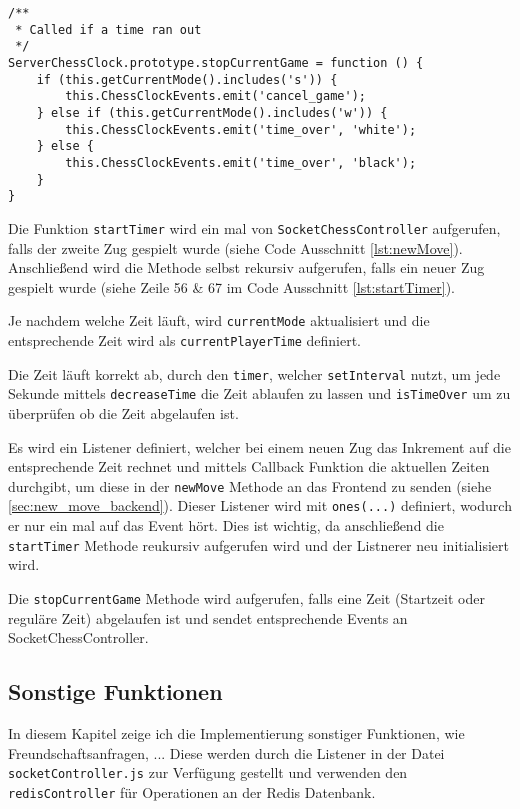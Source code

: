 \begin{lstlisting}[style=codeStyle, caption={Die startTimer und stopCurrentGame Methoden der ServerChessClock Klasse}, label={lst:startTimer}]
/**
 * Called if a time ran out
 */
ServerChessClock.prototype.stopCurrentGame = function () {
    if (this.getCurrentMode().includes('s')) {
        this.ChessClockEvents.emit('cancel_game');
    } else if (this.getCurrentMode().includes('w')) {
        this.ChessClockEvents.emit('time_over', 'white');
    } else {
        this.ChessClockEvents.emit('time_over', 'black');
    }
}
\end{lstlisting}

Die Funktion \verb|startTimer| wird ein mal von \verb|SocketChessController| aufgerufen, falls der zweite Zug gespielt wurde (siehe Code Ausschnitt \ref{lst:newMove}). Anschließend wird die Methode selbst rekursiv aufgerufen, falls ein neuer Zug gespielt wurde (siehe Zeile 56 \& 67 im Code Ausschnitt \ref{lst:startTimer}).

Je nachdem welche Zeit läuft, wird \verb|currentMode| aktualisiert und die entsprechende Zeit wird als \verb|currentPlayerTime| definiert.

Die Zeit läuft korrekt ab, durch den \verb|timer|, welcher \verb|setInterval| nutzt, um jede Sekunde mittels \verb|decreaseTime| die Zeit ablaufen zu lassen und \verb|isTimeOver| um zu überprüfen ob die Zeit abgelaufen ist.

Es wird ein Listener definiert, welcher bei einem neuen Zug das Inkrement auf die entsprechende Zeit rechnet und mittels Callback Funktion die aktuellen Zeiten durchgibt, um diese in der \verb|newMove| Methode an das Frontend zu senden (siehe \ref{sec:new_move_backend}). Dieser Listener wird mit \verb|ones(...)| definiert, wodurch er nur ein mal auf das Event hört. Dies ist wichtig, da anschließend die \verb|startTimer| Methode reukursiv aufgerufen wird und der Listnerer neu initialisiert wird.

Die \verb|stopCurrentGame| Methode wird aufgerufen, falls eine Zeit (Startzeit oder reguläre Zeit) abgelaufen ist und sendet entsprechende Events an SocketChessController.


\subsection{Sonstige Funktionen}
In diesem Kapitel zeige ich die Implementierung sonstiger Funktionen, wie Freundschaftsanfragen, ... Diese werden durch die Listener in der Datei \verb|socketController.js| zur Verfügung gestellt und verwenden den \verb|redisController| für Operationen an der Redis Datenbank.

